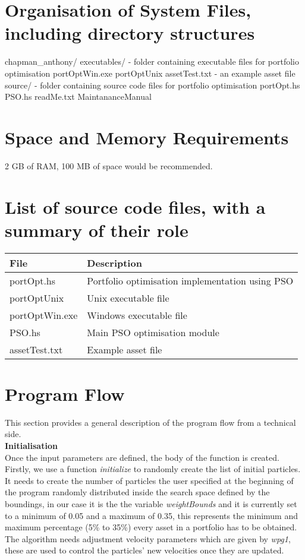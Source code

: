 \section*{Organisation of System Files, including directory structures} 
  \begin{code}
    chapman_anthony/
        executables/ - folder containing executable files for portfolio optimisation 
            portOptWin.exe
            portOptUnix
            assetTest.txt - an example asset file
        source/ - folder containing source code files for portfolio optimisation
            portOpt.hs
            PSO.hs
        readMe.txt
        MaintananceManual
  \end{code}

\section*{Space and Memory Requirements}
  2 GB of RAM, 100 MB of space would be recommended.

\section*{List of source code files, with a summary of their role}
  \begin{tabular}{|l|l|}
    \hline
    \textbf{File} & \textbf{Description} \\
    \hline
    portOpt.hs & Portfolio optimisation implementation using PSO \\
    \hline
    portOptUnix & Unix executable file \\
    \hline
    portOptWin.exe & Windows executable file \\
    \hline
    PSO.hs & Main PSO optimisation module \\
    \hline
    assetTest.txt & Example asset file \\
    \hline
  \end{tabular}

\section*{Program Flow} 
  This section provides a general description of the program flow from a technical side. \\
  \textbf{Initialisation} \\
  Once the input parameters are defined, the body of the function is created. Firstly, we use a function \textit{initialize} to randomly create the list of initial particles. It needs to create the number of particles the user specified at the beginning of the program randomly distributed inside the search space defined by the boundings, in our case it is the the variable \textit{weightBounds} and it is currently set to a minimum of 0.05 and a maximum of 0.35, this represents the minimum and maximum percentage (5\% to 35\%) every asset in a portfolio has to be obtained. The algorithm needs adjustment velocity parameters which are given by \textit{wpg1}, these are used to control the particles' new velocities once they are updated. 


